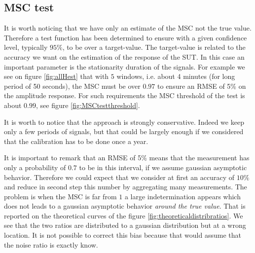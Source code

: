 \subsection{MSC test}

It is worth noticing that we have only an estimate of the MSC not the true value. Therefore a test function has been determined to ensure with a given confidence level, typically $95\%$, to be over a target-value. The target-value is related to the accuracy we want on the estimation of the response of the SUT. In this case an important parameter is the  stationarity duration of the signals. For example we see on figure \ref{fig:allHest} that with $5$ windows, i.e. about 4 minutes (for long period of 50 seconds), the MSC must be over $0.97$ to ensure an RMSE of 5\% on the amplitude response. For such requirements the MSC threshold of the test is about $0.99$, see figure \ref{fig:MSCtestthreshold}.

It is worth to notice that the approach is strongly conservative. Indeed we keep only a few periods of signals, but that could be largely enough if we considered that the calibration has to be done once a year.





  \newpage
 It is important to remark that an RMSE of 5\% means that the measurement has only a probability of $0.7$ to be in this interval, if we assume gaussian asymptotic behavior. Therefore we could expect that we consider at first an accuracy of $10\%$ and reduce in second step this number by aggregating many measurements. The problem is when the MSC is far from $1$ a large indetermination appears which does not leads to a gaussian asymptotic behavior \emph{around the true value}. That is reported on the theoretical curves of the figure \ref{fig:theoreticaldistribratios}. We see that the two ratios are distributed to a gaussian distribution but at a wrong location. It is not possible to correct this bias because that would assume that  the noise ratio is exactly know.


